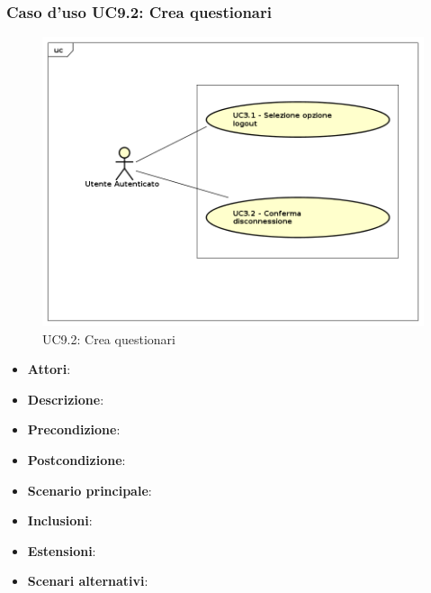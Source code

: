 	\subsubsection{Caso d'uso UC9.2: Crea questionari}
	\label{UC9.2}
	\begin{figure}[h]
		\centering
	\includegraphics[scale=0.7,keepaspectratio]{UML/UC9.png}
		\caption{UC9.2: Crea questionari}
	\end{figure}
	\FloatBarrier
	\begin{itemize}
		\item \textbf{Attori}: 
		\item \textbf{Descrizione}: 
		\item \textbf{Precondizione}: 
		\item \textbf{Postcondizione}: 
		\item \textbf{Scenario principale}:
		\item \textbf{Inclusioni}:
		\item \textbf{Estensioni}:
		\item \textbf{Scenari alternativi}:
	\end{itemize}
	
